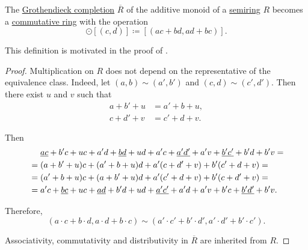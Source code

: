 \begin{proposition}\label{thm:semiring_grothendieck_completion}
  The \hyperref[def:monoid_grothendieck_completion]{Grothendieck completion} \( \overline{R} \) of the additive monoid of a \hyperref[def:semiring]{semiring} \( R \) becomes a \hyperref[def:ring/commutative]{commutative ring} with the operation
  \begin{equation*}
    [(a, b)] \odot [(c, d)] \coloneqq [(ac + bd, ad + bc)].
  \end{equation*}

  This definition is motivated in the proof of .
\end{proposition}
\begin{proof}
  Multiplication on \( R \) does not depend on the representative of the equivalence class. Indeed, let \( (a, b) \sim (a', b') \) and \( (c, d) \sim (c', d') \). Then there exist \( u \) and \( v \) such that
  \begin{align*}
    a + b' + u &= a' + b + u, \\
    c + d' + v &= c' + d + v.
  \end{align*}

  Then
  \begin{align*}
    &\phantom{{}={}}
    \hi{ac} + b'c + uc + a'd + \hi{bd} + ud + a'c + \hi{a'd'} + a'v + \hi{b'c'} + b'd + b'v
    = \\ &=
    (a + b' + u)c + (a' + b + u)d + a'(c + d' + v) + b'(c' + d + v)
    = \\ &=
    (a' + b + u)c + (a + b' + u)d + a'(c' + d + v) + b'(c + d' + v)
    = \\ &=
    a'c + \hi{bc} + uc + \hi{ad} + b'd + ud + \hi{a'c'} + a'd + a'v + b'c + \hi{b'd'} + b'v.
  \end{align*}

  Therefore,
  \begin{equation*}
    (a \cdot c + b \cdot d, a \cdot d + b \cdot c) \sim (a' \cdot c' + b' \cdot d', a' \cdot d' + b' \cdot c').
  \end{equation*}

  Associativity, commutativity and distributivity in \( \overline{R} \) are inherited from \( R \).
\end{proof}

